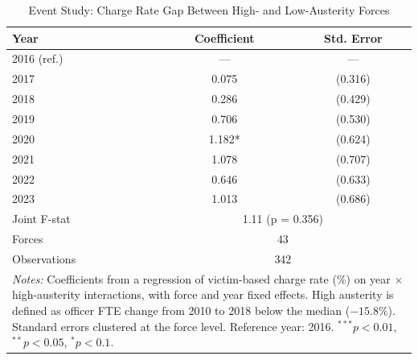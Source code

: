 \begin{table}[!ht]
\centering
\caption{Event Study: Charge Rate Gap Between High- and Low-Austerity Forces}
\label{tab:eventstudy}
\begin{tabular}{lcc}
\hline\hline
Year & Coefficient & Std. Error \\
\hline
2016 (ref.) & --- & --- \\
2017 & 0.075 & (0.316) \\
2018 & 0.286 & (0.429) \\
2019 & 0.706 & (0.530) \\
2020 & 1.182* & (0.624) \\
2021 & 1.078 & (0.707) \\
2022 & 0.646 & (0.633) \\
2023 & 1.013 & (0.686) \\
\hline
Joint F-stat & \multicolumn{2}{c}{1.11 (p = 0.356)} \\
Forces & \multicolumn{2}{c}{43} \\
Observations & \multicolumn{2}{c}{342} \\
\hline\hline
\multicolumn{3}{p{0.85\textwidth}}{\footnotesize \textit{Notes:} Coefficients from a regression of victim-based charge rate (\%) on year $\times$ high-austerity interactions, with force and year fixed effects. High austerity is defined as officer FTE change from 2010 to 2018 below the median ($
-15.8\%
$). Standard errors clustered at the force level. Reference year: 2016. $^{***}p<0.01$, $^{**}p<0.05$, $^{*}p<0.1$.}
\end{tabular}
\end{table}
